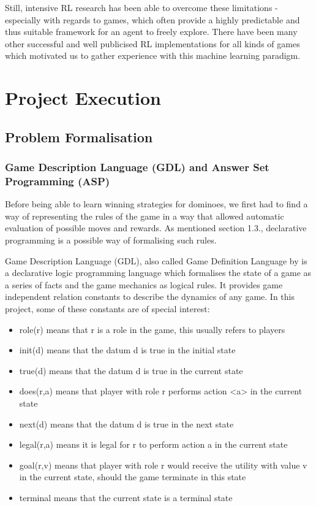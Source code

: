 \documentclass[12pt,a4paper]{article}
\begin{document}
Still, intensive RL research has been able to overcome these limitations - especially with regards to games, which often provide a highly predictable and thus suitable framework for an agent to freely explore. There have been many other successful and well publicised RL implementations for all kinds of games \citep{wiering_reinforcement_2012} which motivated us to gather experience with this machine learning paradigm.


\section{Project Execution}
\subsection{Problem Formalisation}
\subsubsection{Game Description Language (GDL) and Answer Set Programming (ASP)}
Before being able to learn winning strategies for dominoes, we first had to find a way of representing the rules of the game in a way that allowed automatic evaluation of possible moves and rewards. As mentioned section 1.3., declarative programming is a possible way of formalising such rules.

Game Description Language (GDL), also called Game Definition Language by \citet{love_general_2008} is a declarative logic programming language which formalises the state of a game as a series of facts and the game mechanics as logical rules. It provides game independent relation constants to describe the dynamics of any game. In this project, some of these constants are of special interest:
\begin{itemize}
\setlength\itemsep{0.01em}
  \item role(r) means that r is a role in the game, this usually refers to players
  \item init(d) means that the datum d is true in the initial state
  \item true(d) means that the datum d is true in the current state
  \item does(r,a) means that player with role r performs action <a> in the current state
  \item next(d) means that the datum d is true in the next state
  \item legal(r,a) means it is legal for r to perform action a in the current state
  \item goal(r,v) means that player with role r would receive the utility with  value v in the current state, should the game terminate in this state
  \item terminal means that the current state is a terminal state
\end{itemize}
\end{document}
